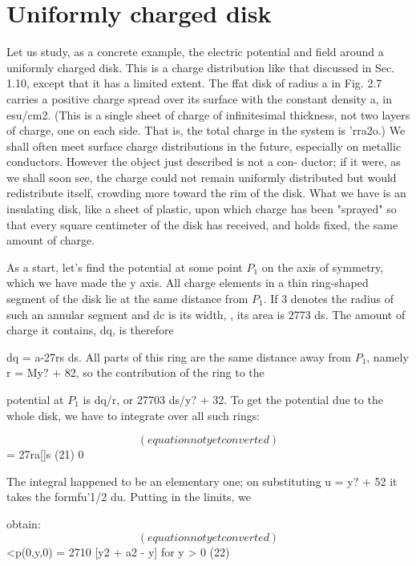 \section{Uniformly charged disk}

Let us study, as a concrete example, the electric potential and field
around a uniformly charged disk. This is a charge distribution like
that discussed in Sec. 1.10, except that it has a limited extent. The
ffat disk of radius a in Fig. 2.7 carries a positive charge spread over its
surface with the constant density a, in esu/cm2. (This is a single sheet
of charge of infinitesimal thickness, not two layers of charge, one on
each side. That is, the total charge in the system is 'rra2o.) We shall
often meet surface charge distributions in the future, especially on
metallic conductors. However the object just described is not a con-
ductor; if it were, as we shall soon see, the charge could not remain
uniformly distributed but would redistribute itself, crowding more
toward the rim of the disk. What we have is an insulating disk, like
a sheet of plastic, upon which charge has been "sprayed" so that every
square centimeter of the disk has received, and holds fixed, the same
amount of charge.

As a start, let's find the potential at some point $P_1$ on the axis of
symmetry, which we have made the y axis. All charge elements in a
thin ring-shaped segment of the disk lie at the same distance from $P_1$.
If 3 denotes the radius of such an annular segment and dc is its width, ,
its area is 2773 ds. The amount of charge it contains, dq, is therefore 

 

dq = a-27rs ds. All parts of this ring are the same distance away
from $P_1$, namely r = My? + 82, so the contribution of the ring to the

potential at $P_1$ is dq/r, or 27703 ds/\/y? + 32. To get the potential
due to the whole disk, we have to integrate over all such rings:

\begin{equation}
(equation not yet converted)
\end{equation}
= 27ra[\W]s (21)
0

The integral happened to be an elementary one; on substituting
u = y? + 52 it takes the formfu'1/2 du. Putting in the limits, we

obtain:
\begin{equation}
(equation not yet converted)
\end{equation}
<p(0,y,0) = 2710 [\/y2 + a2 - y] for y > 0 (22)

